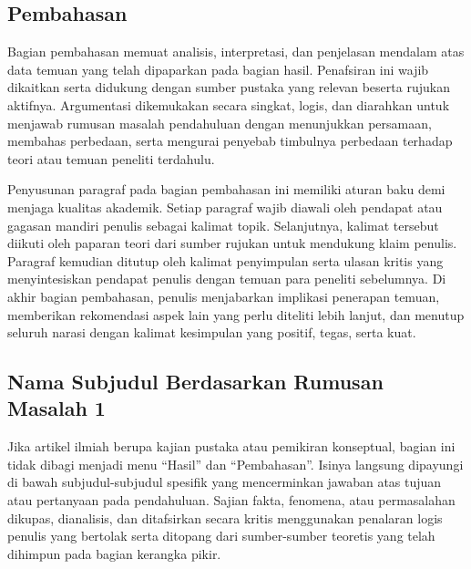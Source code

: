 \subsection{Pembahasan}
Bagian pembahasan memuat analisis, interpretasi, dan penjelasan mendalam atas data temuan yang telah dipaparkan pada bagian hasil. Penafsiran ini wajib dikaitkan serta didukung dengan sumber pustaka yang relevan beserta rujukan aktifnya. Argumentasi dikemukakan secara singkat, logis, dan diarahkan untuk menjawab rumusan masalah pendahuluan dengan menunjukkan persamaan, membahas perbedaan, serta mengurai penyebab timbulnya perbedaan terhadap teori atau temuan peneliti terdahulu.

Penyusunan paragraf pada bagian pembahasan ini memiliki aturan baku demi menjaga kualitas akademik. Setiap paragraf wajib diawali oleh pendapat atau gagasan mandiri penulis sebagai kalimat topik. Selanjutnya, kalimat tersebut diikuti oleh paparan teori dari sumber rujukan untuk mendukung klaim penulis. Paragraf kemudian ditutup oleh kalimat penyimpulan serta ulasan kritis yang menyintesiskan pendapat penulis dengan temuan para peneliti sebelumnya. Di akhir bagian pembahasan, penulis menjabarkan implikasi penerapan temuan, memberikan rekomendasi aspek lain yang perlu diteliti lebih lanjut, dan menutup seluruh narasi dengan kalimat kesimpulan yang positif, tegas, serta kuat.

\subsection{Nama Subjudul Berdasarkan Rumusan Masalah 1}
Jika artikel ilmiah berupa kajian pustaka atau pemikiran konseptual, bagian ini tidak dibagi menjadi menu ``Hasil'' dan ``Pembahasan''. Isinya langsung dipayungi di bawah subjudul-subjudul spesifik yang mencerminkan jawaban atas tujuan atau pertanyaan pada pendahuluan. Sajian fakta, fenomena, atau permasalahan dikupas, dianalisis, dan ditafsirkan secara kritis menggunakan penalaran logis penulis yang bertolak serta ditopang dari sumber-sumber teoretis yang telah dihimpun pada bagian kerangka pikir.